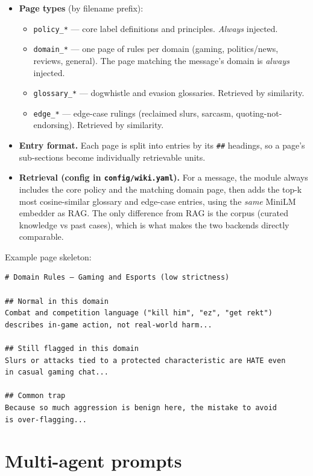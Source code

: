 \begin{itemize}
\tightlist
\item \textbf{Page types} (by filename prefix):
  \begin{itemize}
  \tightlist
  \item \texttt{policy\_*} --- core label definitions and principles. \emph{Always} injected.
  \item \texttt{domain\_*} --- one page of rules per domain (gaming, politics/news, reviews, general). The page matching the message's domain is \emph{always} injected.
  \item \texttt{glossary\_*} --- dogwhistle and evasion glossaries. Retrieved by similarity.
  \item \texttt{edge\_*} --- edge-case rulings (reclaimed slurs, sarcasm, quoting-not-endorsing). Retrieved by similarity.
  \end{itemize}
\item \textbf{Entry format.} Each page is split into entries by its \texttt{\#\#} headings, so a page's sub-sections become individually retrievable units.
\item \textbf{Retrieval (config in \texttt{config/wiki.yaml}).} For a message, the module always includes the core policy and the matching domain page, then adds the top-k most cosine-similar glossary and edge-case entries, using the \emph{same} MiniLM embedder as RAG. The only difference from RAG is the corpus (curated knowledge vs past cases), which is what makes the two backends directly comparable.
\end{itemize}

Example page skeleton:

\begin{verbatim}
# Domain Rules — Gaming and Esports (low strictness)

## Normal in this domain
Combat and competition language ("kill him", "ez", "get rekt") 
describes in-game action, not real-world harm...

## Still flagged in this domain
Slurs or attacks tied to a protected characteristic are HATE even 
in casual gaming chat...

## Common trap
Because so much aggression is benign here, the mistake to avoid 
is over-flagging...
\end{verbatim}

\section{Multi-agent prompts}\label{multi-agent-prompts}

